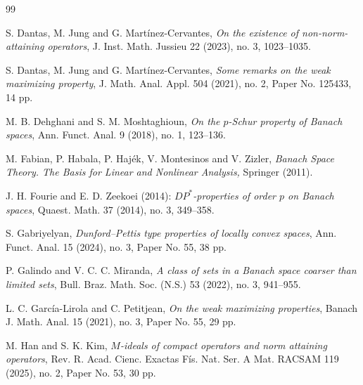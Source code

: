 \documentclass[12 pt]{article}%
\newtheorem{final remark}[theorem]{Final Remark}
\begin{document}
\begin{thebibliography}{99}
\vspace*{-0.8em}

 S. Dantas, M. Jung and G. Martínez-Cervantes, \textit{On the existence of non-norm-attaining operators}, J. Inst. Math. Jussieu 22 (2023), no. 3, 1023–1035.

\vspace*{-0.8em}

 S. Dantas, M. Jung and G. Martínez-Cervantes,  \textit{Some remarks on the weak maximizing property}, J. Math. Anal. Appl. 504 (2021), no. 2, Paper No. 125433, 14 pp.


\vspace*{-0.8em}


 M. B. Dehghani and S. M. Moshtaghioun, \textit{On the $p$-Schur property of Banach spaces}, Ann. Funct. Anal. 9 (2018), no. 1, 123–136.

\vspace*{-0.8em}

 M. Fabian, P. Habala, P. Haj\'ek, V. Montesinos and V. Zizler, \textit{Banach Space Theory. The Basis for Linear and Nonlinear Analysis,} Springer (2011).

\vspace*{-0.8em}

 J. H. Fourie and E. D. Zeekoei (2014): \textit{$DP^*$-properties of order $p$ on Banach spaces}, Quaest. Math. 37 (2014), no. 3, 349–358.

\vspace*{-0.8em}


 S. Gabriyelyan, \textit{Dunford–Pettis type properties of locally convex spaces}, Ann. Funct. Anal. 15 (2024), no. 3, Paper No. 55, 38 pp.

\vspace*{-0.8em}

 P. Galindo and V. C. C. Miranda, \textit{A class of sets in a Banach space coarser than limited sets}, Bull. Braz. Math. Soc. (N.S.) 53 (2022), no. 3, 941–955.

\vspace*{-0.8em}

 L. C. García-Lirola and C. Petitjean, {\it On the weak maximizing properties}, Banach J. Math. Anal. 15 (2021), no. 3, Paper No. 55, 29 pp.

\vspace*{-0.8em}

 M. Han and S. K. Kim, {\it $M$-ideals of compact operators and norm attaining operators}, Rev. R. Acad. Cienc. Exactas Fís. Nat. Ser. A Mat. RACSAM 119 (2025), no. 2, Paper No. 53, 30 pp.



\end{thebibliography}
\end{document}

